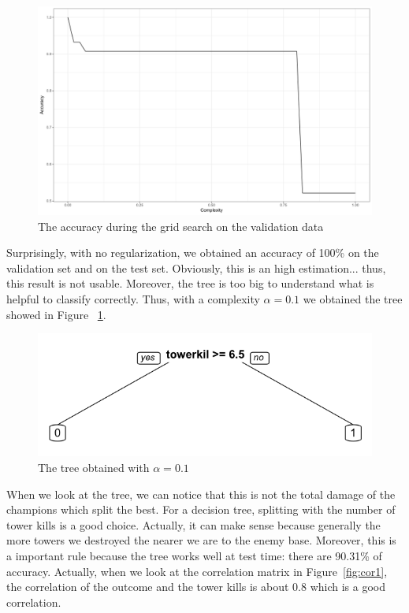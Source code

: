 \documentclass{article}
\def\reg{\alpha}
\begin{document}
\begin{figure}[!hb]
  \includegraphics[scale=0.2]{search.png}
  \centering
  \caption{The accuracy during the grid search on the validation data}
\end{figure}

Surprisingly, with no regularization, we obtained an accuracy of 100\% on the validation set and on the test set. Obviously, this is an high estimation... thus, this result is not usable.  Moreover, the tree is too big to understand what is helpful to classify correctly. Thus, with a complexity $\reg=0.1$ we obtained the tree showed in Figure ~\ref{fig:tree}.

\begin{figure}[!hb]
  \includegraphics[scale=0.5]{tree.png}
  \centering
  \caption{The tree obtained with $\reg=0.1$}
  \label{fig:tree}
\end{figure}

When we look at the tree, we can notice that this is not the total damage of the champions which split the best. For a decision tree, splitting with the number of tower kills is a good choice. Actually, it can make sense because generally the more towers we destroyed the nearer we are to the enemy base. Moreover, this is a important rule because the tree works well at test time: there are 90.31\% of accuracy. Actually, when we look at the correlation matrix in Figure~\ref{fig:cor1}, the correlation of the outcome and the tower kills is about 0.8 which is a good correlation.
\end{document}
